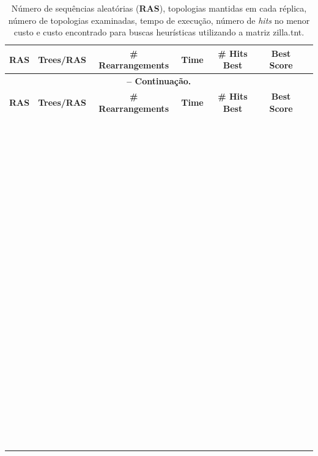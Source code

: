 \begin{refsection}
\pagestyle{fancy}
\begin{center}

\begin{longtable}{|c|c|c|c|c|c|c}
\caption[Tabela \ref{tut4:table:mu}: Buscas heurísticas em TNT]{Número de sequências aleatórias (\textbf{RAS}), topologias mantidas em cada réplica, número de topologias examinadas, tempo de execução, número de \textit{hits} no menor custo e custo encontrado para buscas heurísticas utilizando a matriz zilla.tnt.} \label{tut4:table:mu} \\


\hline\hline \textbf{RAS} & \textbf{Trees/RAS} & \textbf{\# Rearrangements} & \textbf{Time} & \textbf{\# Hits Best} & \textbf{Best Score}\\
\endfirsthead

\multicolumn{6}{c}{{\bfseries \tablename\ \thetable{} -- Continuação.}}\\
\hline\hline \textbf{RAS} & \textbf{Trees/RAS} & \textbf{\# Rearrangements} & \textbf{Time} & \textbf{\# Hits Best} & \textbf{Best Score}\\
\endhead
\hline \hline
\endlastfoot
\hline~&~&~&~&~&~\\
\hline~&~&~&~&~&~\\
\hline~&~&~&~&~&~\\
\hline~&~&~&~&~&~\\
\hline~&~&~&~&~&~\\
\hline~&~&~&~&~&~\\
\hline~&~&~&~&~&~\\
\hline~&~&~&~&~&~\\
\hline~&~&~&~&~&~\\
\hline~&~&~&~&~&~\\
\hline~&~&~&~&~&~\\
\hline~&~&~&~&~&~\\
\hline~&~&~&~&~&~\\
\hline~&~&~&~&~&~\\
\hline~&~&~&~&~&~\\
\hline~&~&~&~&~&~\\
\hline~&~&~&~&~&~\\
\hline~&~&~&~&~&~\\
\hline~&~&~&~&~&~\\
\hline~&~&~&~&~&~\\
\hline~&~&~&~&~&~\\
\hline~&~&~&~&~&~\\


\end{longtable}
\end{center}
\end{refsection}

